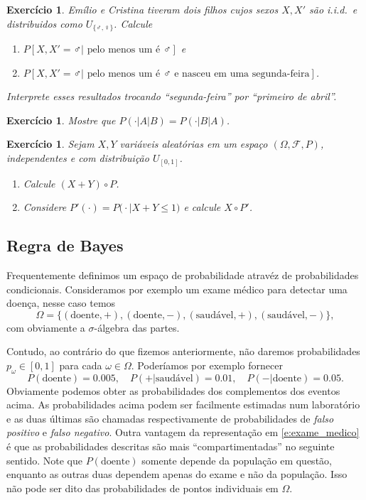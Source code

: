 \documentclass[reqno, final]{book}
\newcommand*\1{\mathds{1}}
\newtheorem{exercise}[example]{Exercício}
\def \iid{i.i.d.~}
\begin{document}
\begin{exercise}
  Emílio e Cristina tiveram dois filhos cujos sexos $X, X'$ são \iid e distribuidos como $U_{\{\male, \female\}}$.
  Calcule
  \begin{enumerate}[\quad a)]
  \item $P[X, X' = \male | \text{ pelo menos um é $\male$}]$ e
  \item $P[X, X' = \male | \text{ pelo menos um é $\male$ e nasceu em uma segunda-feira}]$.
  \end{enumerate}
  Interprete esses resultados trocando ``segunda-feira'' por ``primeiro de abril''.
\end{exercise}

\begin{exercise}
  Mostre que $P(\cdot|A|B) = P(\cdot|B|A)$.
\end{exercise}

\begin{exercise}
  Sejam $X, Y$ vari\'aveis aleat\'orias em um espaço $(\Omega, \mathcal{F}, P)$, independentes e com distribuição $U_{[0,1]}$.
  \begin{enumerate}[\quad a)]
  \item Calcule $(X+Y) \circ P$.
  \item Considere $P'(\cdot) = P\big(\cdot | X + Y \leq 1 \big)$ e calcule $X \circ P'$.
  \end{enumerate}
\end{exercise}

\subsection{Regra de Bayes}

Frequentemente definimos um espaço de probabilidade atravéz de probabilidades condicionais.
Consideramos por exemplo um exame médico para detectar uma doença, nesse caso temos
\begin{equation}
  \Omega = \{(\text{doente}, +), (\text{doente}, -), (\text{saudável}, +), (\text{saudável}, -)\},
\end{equation}
com obviamente a $\sigma$-álgebra das partes.

Contudo, ao contrário do que fizemos anteriormente, não daremos probabilidades $p_\omega \in [0,1]$ para cada $\omega \in \Omega$.
Poderíamos por exemplo fornecer
\begin{equation}
  \label{e:exame_medico}
  P(\text{doente}) = 0.005, \quad P( + | \text{saudável}) = 0.01, \quad P( - | \text{doente}) = 0.05.
\end{equation}
Obviamente podemos obter as probabilidades dos complementos dos eventos acima.
As probabilidades acima podem ser facilmente estimadas num laboratório e as duas últimas são chamadas respectivamente de probabilidades de \emph{falso positivo} e \emph{falso negativo}.
Outra vantagem da representação em \eqref{e:exame_medico} é que as probabilidades descritas são mais ``compartimentadas'' no seguinte sentido.
Note que $P(\text{doente})$ somente depende da população em questão, enquanto as outras duas dependem apenas do exame e não da população.
Isso não pode ser dito das probabilidades de pontos individuais em $\Omega$.
\end{document}
